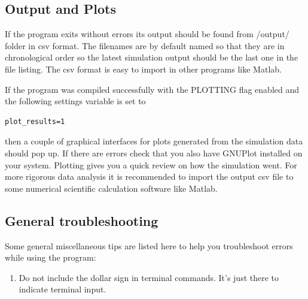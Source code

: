 \documentclass[english,12pt,a4paper,pdftex,sci,utf8]{aaltothesis}
\begin{document}
\subsection{Output and Plots}

If the program exits without errors its output should be found from /output/ folder in csv format. The filenames are by default named so that they are in chronological order so the latest simulation output should be the last one in the file listing. The csv format is easy to import in other programs like Matlab.
\par If the program was compiled successfully with the PLOTTING flag enabled and the following settings variable is set to
\begin{verbatim}
plot_results=1 
\end{verbatim}
then a couple of graphical interfaces for plots generated from the simulation data should pop up. If there are errors check that you also have GNUPlot installed on your system. Plotting gives you a quick review on how the simulation went. For more rigorous data analysis it is recommended to import the output csv file to some numerical scientific calculation software like Matlab.

\subsection{General troubleshooting}
Some general miscellaneous tips are listed here to help you troubleshoot errors while using the program:
\begin{enumerate}
\item Do not include the dollar sign in terminal commands. It's just there to indicate terminal input.
\end{enumerate}
\end{document}
